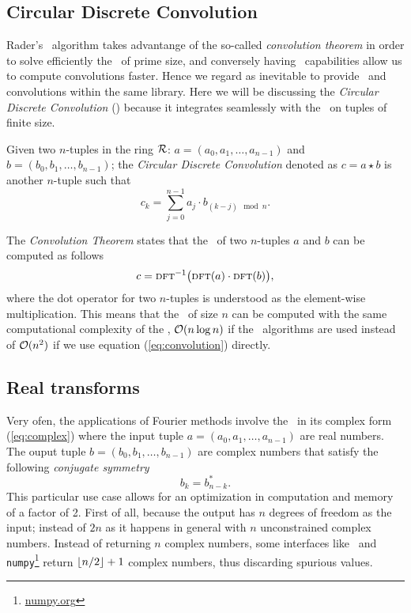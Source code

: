 \subsection{Circular Discrete Convolution}
Rader's \fft\ algorithm takes advantange of the so-called
\emph{convolution theorem} in order to solve efficiently the \dft\ of prime size, 
and conversely having \fft\ capabilities allow
us to compute convolutions faster. Hence we regard as
inevitable to provide \dft\ and convolutions within the same library.
Here we will be discussing the \emph{Circular Discrete Convolution} (\cdc)
because it integrates seamlessly with the \dft\ on tuples of finite size.
\begin{definition}
    Given two $n$-tuples in the ring $\mathcal{R}$: 
    $a = (a_0,a_1,\ldots,a_{n-1})$ and $b=(b_0,b_1,\ldots,b_{n-1})$;
    the \emph{Circular Discrete Convolution} denoted as 
    $c = a\star b$ is another
    $n$-tuple such that
    \begin{equation} 
        c_k = \sum_{j=0}^{n-1} a_j \cdot b_{(k-j) \mod n}.
        \label{eq:convolution}
    \end{equation}
    \label{def:convolution}
\end{definition}
The \emph{Convolution Theorem} states that the \cdc\ of two $n$-tuples $a$ and
$b$ can be computed as follows
\begin{equation}
    c = \textsc{dft}^{-1}\big( \textsc{dft}(a) \cdot \textsc{dft}(b)  \big),
    \label{eq:conv_theorem}
\end{equation}
where the dot operator for two $n$-tuples is understood as the element-wise
multiplication. This means that the \cdc\ of size $n$ can be computed with the
same computational complexity of the \dft, $\mathcal{O}(n\log n)$ if the \fft\
algorithms are used instead of $\mathcal{O}(n^2)$ if we use equation
(\ref{eq:convolution}) directly.

\subsection{Real transforms}
Very ofen, the applications of Fourier methods involve the \dft\ in its complex
form (\ref{eq:complex}) where the input tuple $a = (a_0,a_1,\ldots,a_{n-1})$ are
real numbers.
The ouput tuple $b = (b_0,b_1,\ldots,b_{n-1})$ are complex numbers that satisfy
the following \emph{conjugate symmetry} 
\begin{equation}
    b_{k} = b^*_{n-k}.
    \label{eq:rfft_sym}
\end{equation}
This particular use case allows for an optimization in computation and memory of
a factor of 2. First of all, because the output has $n$ degrees of freedom as
the input; instead of $2n$ as it happens in general with $n$ unconstrained
complex numbers. Instead of returning $n$ complex numbers, some interfaces like
\fftw\ and \texttt{numpy}\footnote{\url{numpy.org}} return $\lfloor n/2 \rfloor+1$
complex numbers, thus discarding spurious values.

